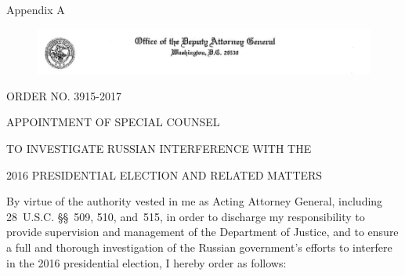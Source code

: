 
\thispagestyle{empty}

\vspace*{15em}

\begin{center}

\Huge
Appendix A

\end{center}

\newpage

\begin{figure}[ht]
    \vspace{-20pt}
    \begin{center}
        \includegraphics[width=8.25in]{images/appendix-a-header.png}%
    \end{center}
    \vspace{-20pt}
\end{figure}

\begin{center}
ORDER NO. 3915-2017

APPOINTMENT OF SPECIAL COUNSEL

TO INVESTIGATE RUSSIAN INTERFERENCE WITH THE

2016 PRESIDENTIAL ELECTION AND RELATED MATTERS
\end{center}

By virtue of the authority vested in me as Acting Attorney General, including 28~U.S.C. \S\S~509, 510, and~515, in order to discharge my responsibility to provide supervision and management of the Department of Justice, and to ensure a full and thorough investigation of the Russian government's efforts to interfere in the 2016 presidential election, I hereby order as follows:

